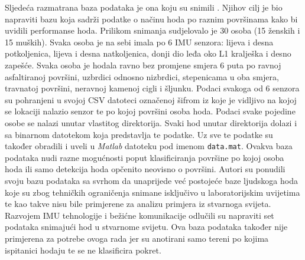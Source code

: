 \documentclass[times, utf8, diplomski]{fer}
\begin{document}
Sljedeća razmatrana baza podataka je ona koju su snimili \cite{uneven}. Njihov cilj je bio napraviti bazu koja sadrži podatke o
načinu hoda po raznim površinama kako bi uvidili performanse hoda. Prilikom snimanja sudjelovalo je 30 osoba (15 ženskih i
15 muških). Svaka osoba je na sebi imala po 6 IMU senzora: lijeva i desna potkoljenica, lijeva i desna natkoljenica, donji dio leđa
oko L1 kralješka i desno zapešće. Svaka osoba je hodala ravno bez promjene smjera 6 puta po ravnoj asfaltiranoj površini, uzbrdici
odnosno nizbrdici, stepenicama u oba smjera, travnatoj površini, neravnoj kamenoj cigli i šljunku. Podaci svakoga od 6 senzora su
pohranjeni u svojoj CSV datoteci označenoj šifrom iz koje je vidljivo na kojoj se lokaciji nalazio senzor te po kojoj površini
osoba hoda. Podaci svake pojedine osobe se nalazi unutar vlastitog direktorija. Svaki hod unutar direktorija dolazi i sa binarnom
datotekom koja predstavlja te podatke. Uz sve te podatke \cite{uneven} su također obradili i uveli u \textit{Matlab} datoteku pod 
imenom \texttt{data.mat}. Ovakva baza podataka nudi razne mogućnosti poput klasificiranja površine po kojoj osoba hoda ili samo 
detekcija hoda opčenito neovisno o površini. Autori su ponudili svoju bazu podataka sa svrhom da unaprijede već postojeće baze
ljudskoga hoda koje su zbog tehničkih ograničenja snimane isključivo u laboratorijskim uvijetima te kao takve nisu bile primjerene
za analizu primjera iz stvarnoga svijeta. Razvojem IMU tehnologije i bežićne komunikacije \cite{uneven} odlučili su napraviti set podataka
snimajući hod u stvarnome svijetu. Ova baza podataka također nije primjerena za potrebe ovoga rada jer su anotirani samo tereni
po kojima ispitanici hodaju te se ne klasificira pokret.
\end{document}
